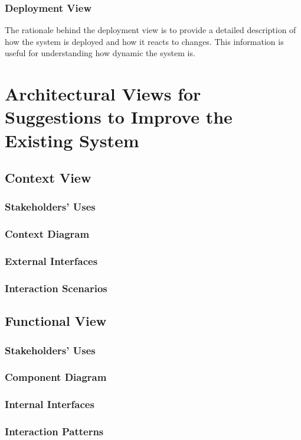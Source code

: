 \documentclass[a4paper]{article}
\begin{document}
    \subsubsection{Deployment View}
    The rationale behind the deployment view is to provide a detailed description of how the system is deployed and how it reacts
    to changes. This information is useful for understanding how dynamic the system is.
    \section{Architectural Views for Suggestions to Improve the Existing System}
    \subsection{Context View}
    \subsubsection{Stakeholders' Uses}
    \lipsum[1-1] %
    \subsubsection{Context Diagram}
    \subsubsection{External Interfaces}
    \lipsum[1-1] %
    \subsubsection{Interaction Scenarios}
    \lipsum[1-1] %
    \subsection{Functional View}
    \subsubsection{Stakeholders' Uses}
    \lipsum[1-1] %
    \subsubsection{Component Diagram}
    \subsubsection{Internal Interfaces}
    \lipsum[1-1] %
    \subsubsection{Interaction Patterns}
    \lipsum[1-1] %
\end{document}
